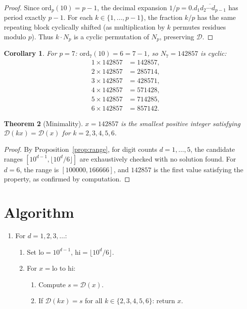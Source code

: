 \documentclass[12pt]{article}
\newtheorem{theorem}{Theorem}
\newtheorem{corollary}[theorem]{Corollary}
\theoremstyle{definition}
\begin{document}
\begin{proof}
Since $\mathrm{ord}_p(10) = p - 1$, the decimal expansion $1/p = 0.\overline{d_1 d_2 \cdots d_{p-1}}$ has period exactly $p - 1$. For each $k \in \{1, \ldots, p-1\}$, the fraction $k/p$ has the same repeating block cyclically shifted (as multiplication by $k$ permutes residues modulo $p$). Thus $k \cdot N_p$ is a cyclic permutation of $N_p$, preserving $\mathcal{D}$.
\end{proof}

\begin{corollary}
For $p = 7$: $\mathrm{ord}_7(10) = 6 = 7 - 1$, so $N_7 = 142857$ is cyclic:
\begin{align*}
1 \times 142857 &= 142857, \\
2 \times 142857 &= 285714, \\
3 \times 142857 &= 428571, \\
4 \times 142857 &= 571428, \\
5 \times 142857 &= 714285, \\
6 \times 142857 &= 857142.
\end{align*}
\end{corollary}

\begin{theorem}[Minimality]
$x = 142857$ is the smallest positive integer satisfying $\mathcal{D}(kx) = \mathcal{D}(x)$ for $k = 2, 3, 4, 5, 6$.
\end{theorem}

\begin{proof}
By Proposition~\ref{prop:range}, for digit counts $d = 1, \ldots, 5$, the candidate ranges $[10^{d-1}, \lfloor 10^d/6 \rfloor]$ are exhaustively checked with no solution found. For $d = 6$, the range is $[100000, 166666]$, and $142857$ is the first value satisfying the property, as confirmed by computation.
\end{proof}

\section{Algorithm}

\begin{enumerate}
    \item For $d = 1, 2, 3, \ldots$:
    \begin{enumerate}
        \item Set $\mathrm{lo} = 10^{d-1}$, $\mathrm{hi} = \lfloor 10^d / 6 \rfloor$.
        \item For $x = \mathrm{lo}$ to $\mathrm{hi}$:
        \begin{enumerate}
            \item Compute $s = \mathcal{D}(x)$.
            \item If $\mathcal{D}(kx) = s$ for all $k \in \{2, 3, 4, 5, 6\}$: return $x$.
        \end{enumerate}
    \end{enumerate}
\end{enumerate}
\end{document}
